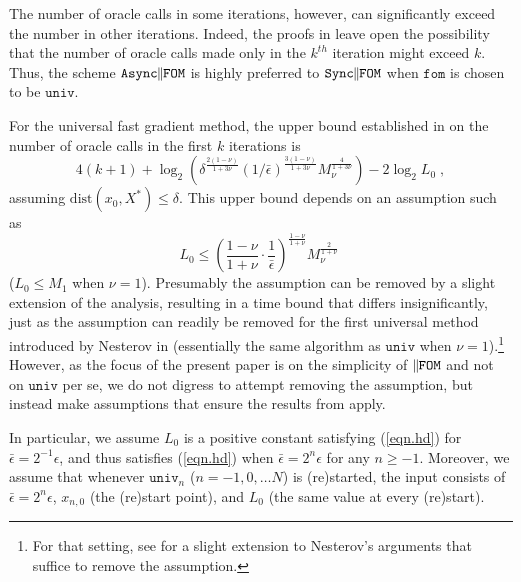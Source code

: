 \documentclass[reqno, 11pt]{amsart}
\numberwithin{equation}{section}
\newcommand{\shrink}[1]{ {\scriptstyle {\textstyle {#1} } } }
\newcommand{\smfrac}[2]{ \shrink{ \frac{#1}{#2} } }
\newcommand{\nt}{\negthinspace}
\newcommand{\fom}{\mathtt{fom}}
\newcommand{\parfom}{\parallel \nt \nt  \mathtt{FOM}}
\newcommand{\univ}{\mathtt{univ}}
\newcommand{\sparfom}{\mathtt{Sync} \nt \nt  \parfom}
\newcommand{\aparfom}{\mathtt{Async} \nt \nt \parfom}
\newcommand{\dist}{\mathrm{dist}}
\begin{document}
The number of oracle calls in some iterations, however, can significantly exceed the number in other iterations. Indeed, the proofs in \cite{nesterov2015universal} leave open the possibility that the number of oracle calls made only in the $ k^{th} $ iteration might exceed $ k $. Thus, the scheme $ \aparfom $ is highly preferred  to $ \sparfom $ when $ \fom $ is chosen to be $ \univ $.

For the universal fast gradient method, the upper bound established in \cite{nesterov2015universal} on the number of oracle calls in the first $ k  $ iterations is 
\begin{equation}   \label{eqn.hc} 
   4( k +1) + \log_2 \left( \delta^{\frac{2(1 - \nu)}{1 + 3 \nu}} (1/ \bar{\epsilon} )^{\frac{3(1-\nu)}{1 + 3 \nu}} M_{\nu}^{ \frac{4}{1 + 3 \nu}} \right) - 2 \log_2 L_0 \; , 
\end{equation} 
assuming $ \dist(x_0,X^*) \leq \delta $.
This upper bound depends on an assumption such as 
\begin{equation}  \label{eqn.hd} 
  L_0 \leq \left( \smfrac{1 - \nu }{1+ \nu } \cdot \smfrac{1}{\bar{\epsilon }} \right)^{\smfrac{1 - \nu }{1+ \nu }} M_{ \nu}^{\smfrac{2}{1+ \nu }}  \;  
  \end{equation} 
($ L_0 \leq M_1 $ when $ \nu = 1 $).
Presumably the assumption can be removed by a slight extension of the analysis, resulting in a time bound that differs insignificantly, just as the assumption can readily be removed for the first universal method introduced by Nesterov in \cite{nesterov2013gradient}  (essentially the same algorithm as $ \univ $ when $ \nu = 1 $).\footnote{For that setting, see \cite[Appendix A]{renegar2017accelerated}  for a slight extension to Nesterov's arguments that suffice to remove the assumption.}  
However, as the focus of the present paper is on the simplicity of $ \parfom $ and not on $ \univ $ per se, we do not digress to attempt removing the assumption, but instead make assumptions that ensure the results from \cite{nesterov2015universal}  apply. 

In particular, we assume $ L_0 $ is a positive constant satisfying (\ref{eqn.hd})  for $ \bar{\epsilon} = 2^{-1} \epsilon $, and thus satisfies (\ref{eqn.hd})  when $ \bar{\epsilon} = 2^n \epsilon $ for any $ n \geq -1 $.  Moreover, we assume that whenever $  \univ_n $ ($ n = -1, 0, \ldots N $) is (re)started, the input consists of $ \bar{\epsilon} = 2^n \epsilon $, $ x_{n,0} $ (the (re)start point), and $ L_0 $ (the same value at every (re)start). 
\end{document}
